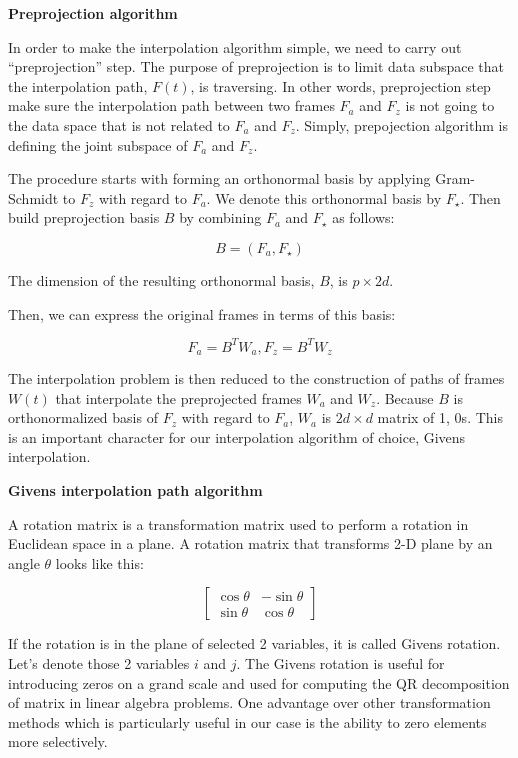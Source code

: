 \textbf{Preprojection algorithm}

In order to make the interpolation algorithm simple, we need to carry out ``preprojection'' step.
The purpose of preprojection is to limit data subspace that the interpolation path, \(F(t)\), is traversing. In other words, preprojection step make sure the interpolation path between two frames \(F_a\) and \(F_z\) is not going to the data space that is not related to \(F_a\) and \(F_z\). Simply, prepojection algorithm is defining the joint subspace of \(F_a\) and \(F_z\).

The procedure starts with forming an orthonormal basis by applying Gram-Schmidt to \(F_z\) with regard to \(F_a\). We denote this orthonormal basis by \(F_\star\). Then build preprojection basis \(B\) by combining \(F_a\) and \(F_\star\) as follows:

\[B = (F_a, F_{\star})\]

The dimension of the resulting orthonormal basis, \(B\), is \(p\times 2d\).

Then, we can express the original frames in terms of this basis:

\[F_a = B^TW_a, F_z = B^TW_z\]

The interpolation problem is then reduced to the construction of paths of frames \(W(t)\) that interpolate the preprojected frames \(W_a\) and \(W_z\). Because \(B\) is orthonormalized basis of \(F_z\) with regard to \(F_a\), \(W_a\) is \(2d\times d\) matrix of 1, 0s. This is an important character for our interpolation algorithm of choice, Givens interpolation.

\textbf{Givens interpolation path algorithm}

A rotation matrix is a transformation matrix used to perform a rotation in Euclidean space in a plane. A rotation matrix that transforms 2-D plane by an angle \(\theta\) looks like this:

\[ \begin{bmatrix}\cos \theta &-\sin \theta \\\sin \theta &\cos \theta \end{bmatrix} \]

If the rotation is in the plane of selected 2 variables, it is called Givens rotation. Let's denote those 2 variables \(i\) and \(j\). The Givens rotation is useful for introducing zeros on a grand scale and used for computing the QR decomposition of matrix in linear algebra problems. One advantage over other transformation methods which is particularly useful in our case is the ability to zero elements more selectively.

